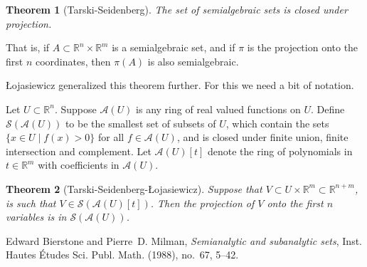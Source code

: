 \documentclass[12pt]{article}
\theoremstyle{theorem}
\newtheorem*{thm}{Theorem}
\theoremstyle{definition}
\theoremstyle{remark}
\begin{document}
\begin{thm}[Tarski-Seidenberg]
The set of semialgebraic sets is closed under projection.
\end{thm}

That is, if $A \subset {\mathbb{R}}^n \times {\mathbb{R}}^m$ is a semialgebraic set, and if $\pi$ is the projection onto the first $n$ coordinates, then
$\pi(A)$ is also semialgebraic.

{\L}ojasiewicz generalized this theorem further.  For this we need a bit of notation.

Let $U \subset {\mathbb{R}}^n$.
Suppose $\mathcal{A}(U)$ is any ring of real valued functions on
$U$.
Define $\mathcal{S}(\mathcal{A}(U))$ to be the smallest
set of subsets of $U$, which contain the sets
$\{ x\in U \mid f(x) > 0 \}$ for all $f \in \mathcal{A}(U)$,
and is closed under finite union, finite intersection and complement.
Let $\mathcal{A}(U)[t]$ denote the ring of polynomials in $t \in {\mathbb{R}}^m$
with coefficients in $\mathcal{A}(U)$.

\begin{thm}[Tarski-Seidenberg-{\L}ojasiewicz]
Suppose that $V \subset U \times {\mathbb{R}}^m \subset {\mathbb{R}}^{n+m}$,
is such that $V \in \mathcal{S}(\mathcal{A}(U)[t])$.
Then the projection of $V$ onto the first $n$ variables
is in $\mathcal{S}(\mathcal{A}(U))$.
\end{thm}

\begin{thebibliography}{9}
Edward Bierstone and Pierre~D. Milman, \emph{Semianalytic and subanalytic
  sets}, Inst. Hautes \'Etudes Sci. Publ. Math. (1988), no.~67, 5--42.
\end{thebibliography}

\end{document}
